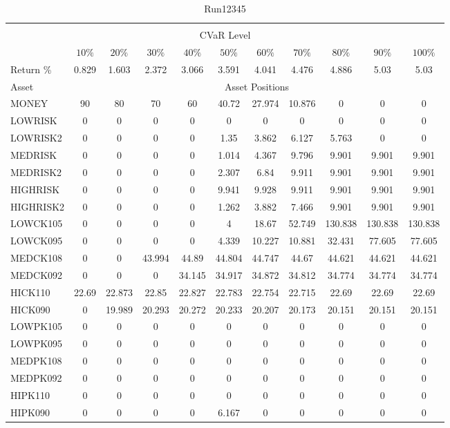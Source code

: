 \begin{table}[h!t]
\caption{Run12345}
\centering
\begin{tabular}[t]{ l c c c c c c c c c c }
\hline\hline \\
\multicolumn{11}{c}{CVaR Level} \\
 & $10\%$ & $20\%$ & $30\%$ & $40\%$ & $50\%$ & $60\%$ & $70\%$ & $80\%$ & $90\%$ & $100\%$ \\[0.5ex]
Return \% &0.829 &1.603 &2.372 &3.066 &3.591 &4.041 &4.476 &4.886 &5.03 &5.03\\[0.5ex]
Asset & \multicolumn{10}{c}{Asset Positions} \\[1ex]
MONEY & 90 & 80 & 70 & 60 & 40.72 & 27.974 & 10.876 & 0 & 0 & 0\\
LOWRISK & 0 & 0 & 0 & 0 & 0 & 0 & 0 & 0 & 0 & 0\\
LOWRISK2 & 0 & 0 & 0 & 0 & 1.35 & 3.862 & 6.127 & 5.763 & 0 & 0\\
MEDRISK & 0 & 0 & 0 & 0 & 1.014 & 4.367 & 9.796 & 9.901 & 9.901 & 9.901\\
MEDRISK2 & 0 & 0 & 0 & 0 & 2.307 & 6.84 & 9.911 & 9.901 & 9.901 & 9.901\\
HIGHRISK & 0 & 0 & 0 & 0 & 9.941 & 9.928 & 9.911 & 9.901 & 9.901 & 9.901\\
HIGHRISK2 & 0 & 0 & 0 & 0 & 1.262 & 3.882 & 7.466 & 9.901 & 9.901 & 9.901\\
LOWCK105 & 0 & 0 & 0 & 0 & 4 & 18.67 & 52.749 & 130.838 & 130.838 & 130.838\\
LOWCK095 & 0 & 0 & 0 & 0 & 4.339 & 10.227 & 10.881 & 32.431 & 77.605 & 77.605\\
MEDCK108 & 0 & 0 & 43.994 & 44.89 & 44.804 & 44.747 & 44.67 & 44.621 & 44.621 & 44.621\\
MEDCK092 & 0 & 0 & 0 & 34.145 & 34.917 & 34.872 & 34.812 & 34.774 & 34.774 & 34.774\\
HICK110 & 22.69 & 22.873 & 22.85 & 22.827 & 22.783 & 22.754 & 22.715 & 22.69 & 22.69 & 22.69\\
HICK090 & 0 & 19.989 & 20.293 & 20.272 & 20.233 & 20.207 & 20.173 & 20.151 & 20.151 & 20.151\\
LOWPK105 & 0 & 0 & 0 & 0 & 0 & 0 & 0 & 0 & 0 & 0\\
LOWPK095 & 0 & 0 & 0 & 0 & 0 & 0 & 0 & 0 & 0 & 0\\
MEDPK108 & 0 & 0 & 0 & 0 & 0 & 0 & 0 & 0 & 0 & 0\\
MEDPK092 & 0 & 0 & 0 & 0 & 0 & 0 & 0 & 0 & 0 & 0\\
HIPK110 & 0 & 0 & 0 & 0 & 0 & 0 & 0 & 0 & 0 & 0\\
HIPK090 & 0 & 0 & 0 & 0 & 6.167 & 0 & 0 & 0 & 0 & 0\\
[1ex] \hline
\end{tabular}
\end{table} 